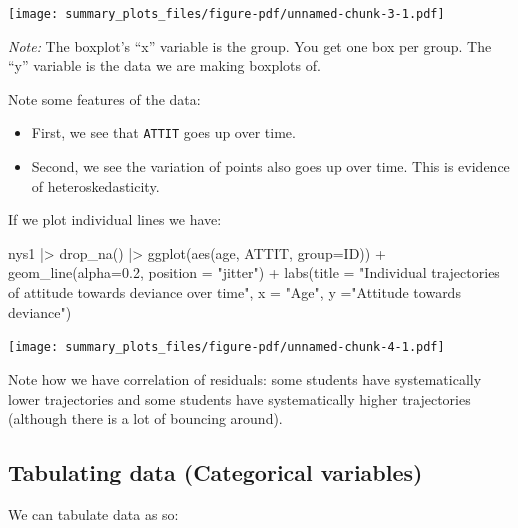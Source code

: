 \documentclass[
  letterpaper,
  DIV=11,
  numbers=noendperiod]{scrreprt}
\newenvironment{Shaded}{}{}
\newcommand{\AttributeTok}[1]{\textcolor[rgb]{0.49,0.56,0.16}{#1}}
\newcommand{\FloatTok}[1]{\textcolor[rgb]{0.25,0.63,0.44}{#1}}
\newcommand{\FunctionTok}[1]{\textcolor[rgb]{0.02,0.16,0.49}{#1}}
\newcommand{\NormalTok}[1]{#1}
\newcommand{\SpecialCharTok}[1]{\textcolor[rgb]{0.25,0.44,0.63}{#1}}
\newcommand{\StringTok}[1]{\textcolor[rgb]{0.25,0.44,0.63}{#1}}
\providecommand{\tightlist}{%
  \setlength{\itemsep}{0pt}\setlength{\parskip}{0pt}}\usepackage{longtable,booktabs,array}
\begin{document}
\texttt{[image: summary\_plots\_files/figure-pdf/unnamed-chunk-3-1.pdf]}

\emph{Note:} The boxplot's ``x'' variable is the group. You get one box
per group. The ``y'' variable is the data we are making boxplots of.

Note some features of the data:

\begin{itemize}
\tightlist
\item
  First, we see that \texttt{ATTIT} goes up over time.
\item
  Second, we see the variation of points also goes up over time. This is
  evidence of heteroskedasticity.
\end{itemize}

If we plot individual lines we have:

\begin{Shaded}
\begin{Highlighting}[]
\NormalTok{nys1 }\SpecialCharTok{|\textgreater{}} 
  \FunctionTok{drop\_na}\NormalTok{() }\SpecialCharTok{|\textgreater{}} 
  \FunctionTok{ggplot}\NormalTok{(}\FunctionTok{aes}\NormalTok{(age, ATTIT, }\AttributeTok{group=}\NormalTok{ID)) }\SpecialCharTok{+}
    \FunctionTok{geom\_line}\NormalTok{(}\AttributeTok{alpha=}\FloatTok{0.2}\NormalTok{, }\AttributeTok{position =} \StringTok{"jitter"}\NormalTok{) }\SpecialCharTok{+} 
    \FunctionTok{labs}\NormalTok{(}\AttributeTok{title =} \StringTok{"Individual trajectories of attitude towards deviance over time"}\NormalTok{,}
         \AttributeTok{x =} \StringTok{"Age"}\NormalTok{,}
         \AttributeTok{y =}\StringTok{"Attitude towards deviance"}\NormalTok{)}
\end{Highlighting}
\end{Shaded}

\texttt{[image: summary\_plots\_files/figure-pdf/unnamed-chunk-4-1.pdf]}

Note how we have correlation of residuals: some students have
systematically lower trajectories and some students have systematically
higher trajectories (although there is a lot of bouncing around).

\subsection{Tabulating data (Categorical
variables)}\label{tabulating-data-categorical-variables}

We can tabulate data as so:

\begin{Shaded}
\end{Shaded}
\end{document}
